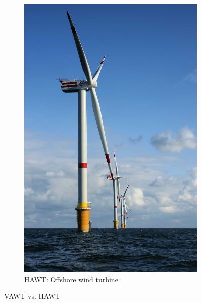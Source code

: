 \begin{figure}[!b]
        \begin{subfigure}[b]{0.25\textwidth}
                \includegraphics[height=0.2\textheight]{figures/introduction/HAWT_compressed.jpg}
                \caption{HAWT: Offshore wind turbine \cite{HAWTWindmill}}
                \label{fig:HAWT}
        \end{subfigure}
        \caption{VAWT vs. HAWT}
        \label{fig:VAWTvsHAWT}
	\end{figure}

